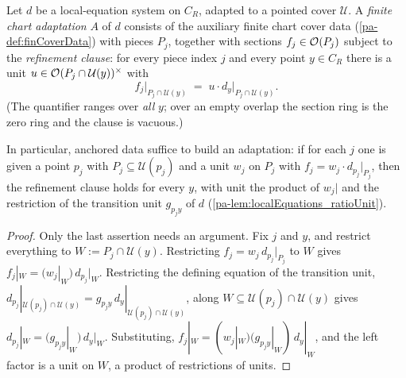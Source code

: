 \begin{definition}
  \label{pa-def:divisorAdaptation}
  \leanok

  Let \(d\) be a local-equation system on \(C_R\), adapted to a pointed cover
  \(\mathcal U\). A \emph{finite chart adaptation} \(A\) of \(d\) consists of the auxiliary
  finite chart cover data (\ref{pa-def:finCoverData}) with pieces \(P_j\), together with sections
  \(f_j \in \mathcal{O}_{}(P_j)\) subject to the \emph{refinement clause}: for every piece index
  \(j\) and every point \(y \in C_R\) there is a unit
  \(u \in \mathcal{O}_{}(P_j \cap \mathcal U(y))^{\times}\) with
  \[
    f_j\big|_{P_j \cap \mathcal U(y)} \;=\; u \cdot d_y\big|_{P_j \cap \mathcal U(y)} .
  \]
  (The quantifier ranges over \emph{all} \(y\); over an empty overlap the section ring is
  the zero ring and the clause is vacuous.)

  In particular, anchored data suffice to build an adaptation: if for each \(j\) one is
  given a point \(p_j\) with \(P_j \subseteq \mathcal U(p_j)\) and a unit \(w_j\) on
  \(P_j\) with \(f_j = w_j \cdot d_{p_j}|_{P_j}\), then the refinement clause holds for
  every \(y\), with unit the product of \(w_j|\) and the restriction of the transition unit
  \(g_{p_j y}\) of \(d\) (\ref{pa-lem:localEquations_ratioUnit}).
\end{definition}
\begin{proof}
  \leanok
  Only the last assertion needs an argument. Fix \(j\) and \(y\), and restrict everything
  to \(W := P_j \cap \mathcal U(y)\). Restricting \(f_j = w_j\, d_{p_j}|_{P_j}\) to \(W\)
  gives \(f_j|_W = (w_j|_W)\, d_{p_j}|_W\). Restricting the defining equation of the
  transition unit, \(d_{p_j}|_{\mathcal U(p_j) \cap \mathcal U(y)} = g_{p_j y}\,
  d_y|_{\mathcal U(p_j)\cap\mathcal U(y)}\), along \(W \subseteq \mathcal U(p_j) \cap
  \mathcal U(y)\) gives \(d_{p_j}|_W = (g_{p_j y}|_W)\, d_y|_W\). Substituting,
  \(f_j|_W = (w_j|_W)(g_{p_j y}|_W)\, d_y|_W\), and the left factor is a unit on \(W\), a
  product of restrictions of units.
\end{proof}

